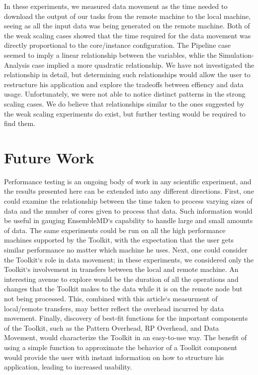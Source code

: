 \documentclass[]{article}
\begin{document}
    In these experiments, we measured data movement as the time needed to download the output of our tasks from the remote machine to the local machine, seeing as all the input data was being generated on the remote machine. Both of the weak scaling cases showed that the time required for the data movement was directly proportional to the core/instance configuration. The Pipeline case seemed to imply a linear relationship between the variables, whlie the Simulation-Analysis case implied a more quadratic relationship. We have not investigated the relationship in detail, but determining such relationships would allow the user to restructure his application and explore the tradeoffs between effiency and data usage. Unfortunately, we were not able to notice distinct patterns in the strong scaling cases. We do believe that relationships similar to the ones suggested by the weak scaling experiments do exist, but further testing would be required to find them.

\section{Future Work}
	Performance testing is an ongoing body of work in any scientific experiment, and the results presented here can be extended into any different directions. First, one could examine the relationship between the time taken to process varying sizes of data and the number of cores given to process that data. Such information would be useful in gauging EnsembleMD`s capability to handle large and small amounts of data. The same experiments could be run on all the high performance machines supported by the Toolkit, with the expectation that the user gets similar performance no matter which machine he uses. Next, one could consider the Toolkit`s role in data movement; in these experiments, we considered only the Toolkit`s involvement in transfers between the local and remote machine. An interesting avenue to explore would be the duration of all the operations and changes that the Toolkit makes to the data while it is on the remote node but not being processed. This, combined with this article`s measurment of local/remote transfers, may better reflect the overhead incurred by data movement. Finally, discovery of best-fit functions for the important components of the Toolkit, such as the Pattern Overhead, RP Overhead, and Data Movement, would characterize the Toolkit in an easy-to-use way. The benefit of using a simple function to approximate the behavior of a Toolkit component would provide the user with instant information on how to structure his application, leading to increased usability.
\end{document}
